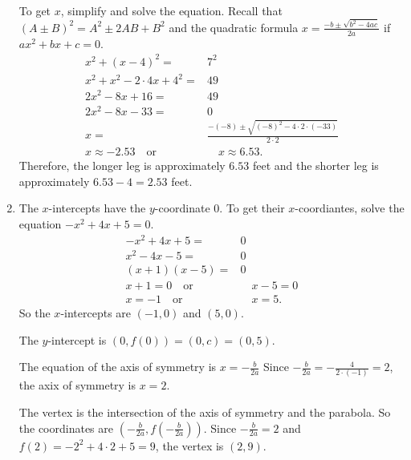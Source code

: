 \documentclass[
  12pt]{article}
\begin{document}
\begin{enumerate}
  To get \(x\), simplify and solve the equation. Recall that
  \((A\pm B)^2=A^2\pm 2AB+B^2\) and the quadratic formula
  \(x=\frac{-b\pm\sqrt{b^2-4ac}}{2a}\) if \(ax^2+bx+c=0\). \[
  \begin{aligned}
  x^2+(x-4)^2=&7^2\\
  x^2+x^2-2\cdot 4x+4^2=&49\\
  2x^2-8x+16=&49\\
  2x^2-8x-33=&0\\
  x=&\frac{-(-8)\pm\sqrt{(-8)^2-4\cdot2\cdot(-33)}}{2\cdot 2}\\
  x\approx -2.53\quad\text{or}&\quad x\approx 6.53.
  \end{aligned}
  \] Therefore, the longer leg is approximately \(6.53\) feet and the
  shorter leg is approximately \(6.53-4=2.53\) feet.
\item
  The \(x\)-intercepts have the \(y\)-coordinate \(0\). To get their
  \(x\)-coordiantes, solve the equation \(-x^2+4x+5=0\). \[
  \begin{aligned}
  -x^2+4x+5=&0\\
  x^2-4x-5=&0\\
  (x+1)(x-5)=&0\\
  x+1=0\quad\text{or}&\quad x-5=0\\
  x=-1\quad\text{or}&\quad x=5.
  \end{aligned}
  \] So the \(x\)-intercepts are \((-1, 0)\) and \((5, 0)\).

  The \(y\)-intercept is \((0, f(0))=(0, c)=(0, 5)\).

  The equation of the axis of symmetry is \(x=-\frac{b}{2a}\) Since
  \(-\frac{b}{2a}=-\frac{4}{2\cdot(-1)}=2\), the axix of symmetry is
  \(x=2\).

  The vertex is the intersection of the axis of symmetry and the
  parabola. So the coordinates are
  \(\left(-\frac{b}{2a}, f\left(-\frac{b}{2a}\right)\right)\). Since
  \(-\frac{b}{2a}=2\) and \(f(2)=-2^2+4\cdot 2+5=9\), the vertex is
  \((2, 9)\).


\end{enumerate}
\end{document}
